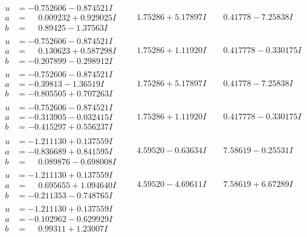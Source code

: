 \documentclass[1p]{elsarticle_modified}
\theoremstyle{definition}
\begin{document}
$$\begin{array}{c|c|c}
\begin{aligned}
u &= -0.752606 - 0.874521 I \\
a &= \phantom{-}0.009232 + 0.929025 I \\
b &= \phantom{-}0.89425 - 1.37563 I\end{aligned}
 & \phantom{-}1.75286 + 5.17897 I & \phantom{-}0.41778 - 7.25838 I \\ \hline\begin{aligned}
u &= -0.752606 - 0.874521 I \\
a &= \phantom{-}0.130623 + 0.587298 I \\
b &= -0.207899 - 0.298912 I\end{aligned}
 & \phantom{-}1.75286 + 1.11920 I & \phantom{-}0.417778 - 0.330175 I \\ \hline\begin{aligned}
u &= -0.752606 - 0.874521 I \\
a &= -0.39813 - 1.36519 I \\
b &= -0.805505 + 0.707263 I\end{aligned}
 & \phantom{-}1.75286 + 5.17897 I & \phantom{-}0.41778 - 7.25838 I \\ \hline\begin{aligned}
u &= -0.752606 - 0.874521 I \\
a &= -0.313905 - 0.032415 I \\
b &= -0.415297 + 0.556237 I\end{aligned}
 & \phantom{-}1.75286 + 1.11920 I & \phantom{-}0.417778 - 0.330175 I \\ \hline\begin{aligned}
u &= -1.211130 + 0.137559 I \\
a &= -0.836689 + 0.841595 I \\
b &= \phantom{-}0.089876 - 0.698008 I\end{aligned}
 & \phantom{-}4.59520 - 0.63634 I & \phantom{-}7.58619 - 0.25531 I \\ \hline\begin{aligned}
u &= -1.211130 + 0.137559 I \\
a &= \phantom{-}0.695655 + 1.094640 I \\
b &= -0.211353 - 0.748765 I\end{aligned}
 & \phantom{-}4.59520 - 4.69611 I & \phantom{-}7.58619 + 6.67289 I \\ \hline\begin{aligned}
u &= -1.211130 + 0.137559 I \\
a &= -0.102962 - 0.629929 I \\
b &= \phantom{-}0.99311 + 1.23007 I\end{aligned}

\end{array}$$
\end{document}
